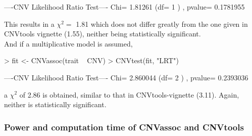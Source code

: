 \documentclass[11pt]{article}
\begin{document}
\begin{Schunk}
\begin{Soutput}
----CNV Likelihood Ratio Test----
Chi= 1.81261 (df= 1 ) , pvalue= 0.1781955 
\end{Soutput}
\end{Schunk}


This results in a $\chi^2 =$ 1.81 which does not differ greatly from the one given 
in CNVtools vignette \cite{CNVtools-vignette} (1.55), neither being statistically significant. \\

And if a multiplicative model is assumed, 
\begin{Schunk}
\begin{Sinput}
> fit <- CNVassoc(trait ~ CNV)
> CNVtest(fit, "LRT")
\end{Sinput}
\begin{Soutput}
----CNV Likelihood Ratio Test----
Chi= 2.860044 (df= 2 ) , pvalue= 0.2393036 
\end{Soutput}
\end{Schunk}


\noindent a $\chi^2$ of 2.86 is obtained, similar to that in CNVtools-vignette \cite{CNVtools-vignette} 
(3.11). Again, neither is statistically significant.


\subsubsection{Power and computation time of CNVassoc and CNVtools}
\end{document}
